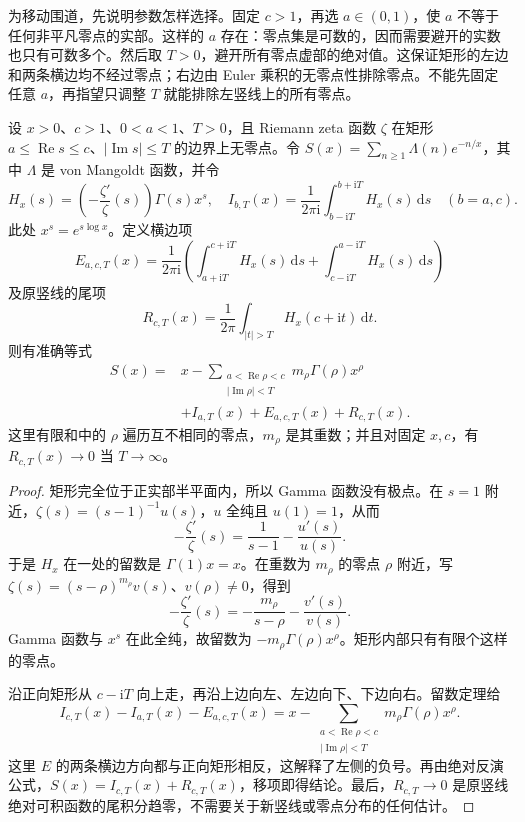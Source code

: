 为移动围道，先说明参数怎样选择。固定 \(c>1\)，再选 \(a\in(0,1)\)，使 \(a\) 不等于任何非平凡零点的实部。这样的 \(a\) 存在：零点集是可数的，因而需要避开的实数也只有可数多个。然后取 \(T>0\)，避开所有零点虚部的绝对值。这保证矩形的左边和两条横边均不经过零点；右边由 Euler 乘积的无零点性排除零点。不能先固定任意 \(a\)，再指望只调整 \(T\) 就能排除左竖线上的所有零点。

\begin{proposition}[有限矩形中的平滑显式公式]\label{b3:prop:26-finite-explicit-formula}
设 \(x>0\)、\(c>1\)、\(0<a<1\)、\(T>0\)，且 Riemann zeta 函数 \(\zeta\) 在矩形 \(a\le\operatorname{Re}s\le c\)、\(|\operatorname{Im}s|\le T\) 的边界上无零点。令 \(S(x)=\sum_{n\ge1}\Lambda(n)e^{-n/x}\)，其中 \(\Lambda\) 是 von Mangoldt 函数，并令
\[
 H_x(s)=\left(-\frac{\zeta'}{\zeta}(s)\right)\Gamma(s)x^s,
 \quad
 I_{b,T}(x)=\frac1{2\pi\mathrm i}
              \int_{b-\mathrm iT}^{b+\mathrm iT}H_x(s)\,\mathrm ds
              \quad(b=a,c).
\]
此处 \(x^s=e^{s\log x}\)。定义横边项
\[
 E_{a,c,T}(x)=\frac1{2\pi\mathrm i}
 \left(\int_{a+\mathrm iT}^{c+\mathrm iT}H_x(s)\,\mathrm ds
       +\int_{c-\mathrm iT}^{a-\mathrm iT}H_x(s)\,\mathrm ds\right)
\]
及原竖线的尾项
\[
 R_{c,T}(x)=\frac1{2\pi}
          \int_{|t|>T}H_x(c+\mathrm it)\,\mathrm dt.
\]
则有准确等式
\begin{equation}\label{b3:eq:26-finite-explicit-formula}
 \begin{aligned}
 S(x)={}&x-
 \sum_{\substack{a<\operatorname{Re}\rho<c\\|\operatorname{Im}\rho|<T}}
          m_\rho\Gamma(\rho)x^\rho\\
 &+I_{a,T}(x)+E_{a,c,T}(x)+R_{c,T}(x).
 \end{aligned}
\end{equation}
这里有限和中的 \(\rho\) 遍历互不相同的零点，\(m_\rho\) 是其重数；并且对固定 \(x,c\)，有 \(R_{c,T}(x)\to0\) 当 \(T\to\infty\)。
\end{proposition}
\begin{proof}
矩形完全位于正实部半平面内，所以 Gamma 函数没有极点。在 \(s=1\) 附近，\(\zeta(s)=(s-1)^{-1}u(s)\)，\(u\) 全纯且 \(u(1)=1\)，从而
\[
 -\frac{\zeta'}{\zeta}(s)=\frac1{s-1}-\frac{u'(s)}{u(s)}.
\]
于是 \(H_x\) 在一处的留数是 \(\Gamma(1)x=x\)。在重数为 \(m_\rho\) 的零点 \(\rho\) 附近，写 \(\zeta(s)=(s-\rho)^{m_\rho}v(s)\)、\(v(\rho)\ne0\)，得到
\[
 -\frac{\zeta'}{\zeta}(s)
       =-\frac{m_\rho}{s-\rho}-\frac{v'(s)}{v(s)}.
\]
Gamma 函数与 \(x^s\) 在此全纯，故留数为 \(-m_\rho\Gamma(\rho)x^\rho\)。矩形内部只有有限个这样的零点。

沿正向矩形从 \(c-\mathrm iT\) 向上走，再沿上边向左、左边向下、下边向右。留数定理给
\[
 I_{c,T}(x)-I_{a,T}(x)-E_{a,c,T}(x)
 =x-\sum_{\substack{a<\operatorname{Re}\rho<c\\|\operatorname{Im}\rho|<T}}
            m_\rho\Gamma(\rho)x^\rho.
\]
这里 \(E\) 的两条横边方向都与正向矩形相反，这解释了左侧的负号。再由绝对反演公式，\(S(x)=I_{c,T}(x)+R_{c,T}(x)\)，移项即得结论。最后，\(R_{c,T}\to0\) 是原竖线绝对可积函数的尾积分趋零，不需要关于新竖线或零点分布的任何估计。
\end{proof}

